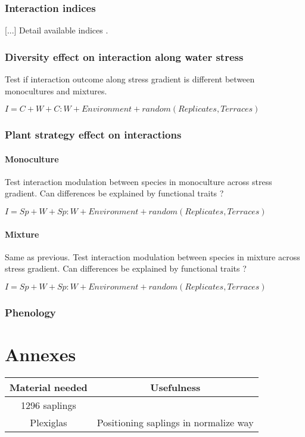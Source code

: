 \documentclass[12pt]{article} %
\begin{document}
\subsubsection{Interaction indices}
[...] Detail available indices \citep{Seifan2010}.

\subsubsection{Diversity effect on interaction along water stress}
Test if interaction outcome along stress gradient is different between monocultures and mixtures.

$I= C + W + C:W + Environment + random(Replicates,Terraces)$

\subsubsection{Plant strategy effect on interactions}

\paragraph{Monoculture}
Test interaction modulation between species in monoculture across stress gradient. Can differences be explained by functional traits ?

$I= Sp + W + Sp:W + Environment + random(Replicates,Terraces)$

\paragraph{Mixture}
Same as previous. Test interaction modulation between species in mixture across stress gradient. Can differences be explained by functional traits ?

$I= Sp + W + Sp:W + Environment + random(Replicates,Terraces)$


\subsubsection{Phenology}




\begin{spacing}{1.0}
%

\end{spacing}

\section{Annexes}

\begin{table}
\begin{center}
\begin{tabular}{cc}
Material needed & Usefulness \\
\hline
1296 saplings & \\
Plexiglas & Positioning saplings in normalize way\\

\end{tabular}
\end{center}
\end{table}
\end{document}
